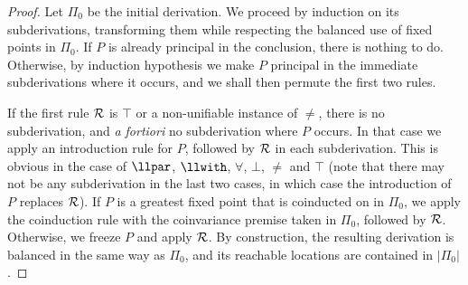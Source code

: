 \begin{proof}
Let $\Pi_0$ be the initial derivation.
We proceed by induction on its subderivations,
transforming them while respecting the balanced use of fixed points
in $\Pi_0$.
If $P$ is already principal in the conclusion, there is nothing to do.
Otherwise, by induction hypothesis
we make $P$ principal in the immediate subderivations where it occurs,
and we shall then permute the first two rules.

If the first rule ${\cal R}$
is $\top$ or a non-unifiable instance of $\neq$, there is no subderivation,
and \emph{a fortiori} no subderivation where $P$ occurs.
In that case we apply an introduction rule for $P$,
followed by ${\cal R}$ in each subderivation.
This is obvious in the case of $\llpar$, $\llwith$, $\forall$, $\bot$,
$\neq$ and $\top$ (note that there may not be any subderivation in the last
two cases, in which case the introduction of $P$ replaces ${\cal R}$).
If $P$ is a greatest fixed point that is coinducted on in $\Pi_0$,
we apply the coinduction rule with the coinvariance premise taken in $\Pi_0$,
followed by ${\cal R}$.
Otherwise, we freeze $P$ and apply ${\cal R}$.
By construction, the resulting derivation is balanced in the same way as
$\Pi_0$, and its reachable locations are contained in $|\Pi_0|$.


\end{proof}
